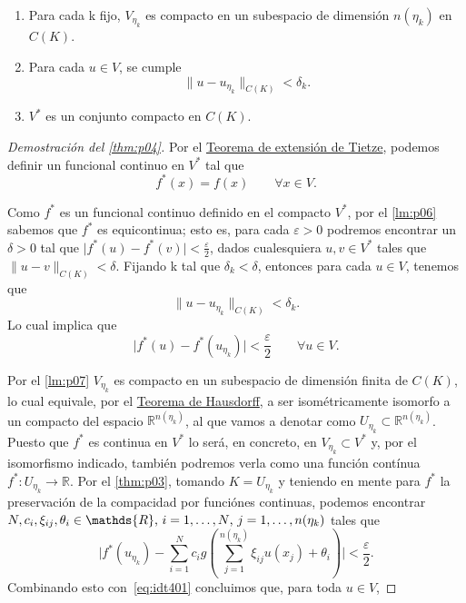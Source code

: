 \begin{lema}\label{lm:p07}
\leavevmode\newline
\begin{enumerate}
\item Para cada k fijo, $V_{\eta_{k}}$ es compacto en un subespacio de dimensión $n(\eta_{k})$ en $C(K)$.
\item Para cada \(u \in V\), se cumple 
\[ \parallel u - u_{\eta_{k}}\parallel_{C(K)} < \delta_{k}.\]
\item $V^{*}$ es un conjunto compacto en $C(K)$.
\end{enumerate}
\end{lema}
\begin{proof}[Demostración del \autoref{thm:p04}]
Por el \hyperref[thm:h07]{Teorema de extensión de Tietze}, podemos definir un funcional continuo en $V^{*}$ tal que \[ f^{*}(x) = f(x) \qquad  \forall x\in V.\]

Como $f^{*}$ es un funcional continuo definido en el compacto $V^{*}$, por el \autoref{lm:p06} sabemos que $f^{*}$ es equicontinua; esto es, para cada \( \varepsilon >0\) podremos encontrar un \(\delta > 0 \) tal que \( \vert f^{*}(u)-f^{*}(v)\vert < \frac{\varepsilon}{2} \), dados cualesquiera \(u,v\in V^{*}\) tales que \(\parallel u-v\parallel_{C(K)}<\delta\).
Fijando k tal que \(\delta_{k}<\delta\), entonces para cada \( u\in V\), tenemos que \[\parallel u - u_{\eta_{k}}\parallel_{C(K)} < \delta_{k}.\]
Lo cual implica que
\begin{equation}\label{eq:idt401}
\vert f^{*}(u)-f^{*}(u_{\eta_{k}})\vert < \frac{\varepsilon}{2} \qquad \forall u\in V.
\end{equation}

Por el \autoref{lm:p07} $V_{\eta_{k}}$ es compacto en un subespacio de dimensión finita de $C(K)$, lo cual equivale, por el \hyperref[thm:h01]{Teorema de Hausdorff}, a ser isométricamente isomorfo a un compacto del espacio $ \mathds{R}^{n(\eta_{k})}$, al que vamos a denotar como $U_{\eta_{k}}\subset \mathds{R}^{n(\eta_{k})}$. Puesto que $f^{*}$ es continua en $V^{*}$ lo será, en concreto, en $V_{\eta_{k}}\subset V^{*}$ y, por el isomorfismo indicado, también podremos verla como una función contínua $f^{*}:U_{\eta_{k}}\rightarrow \mathds{R}$. Por el \autoref{thm:p03}, tomando $K=U_{\eta_{k}}$ y teniendo en mente para $f^{*}$ la preservación de la compacidad por funciónes continuas, podemos encontrar 
\( N,c_{i} , \xi_{ij} , \theta_{i} \in \mathds{R}$, $i=1,\ldots,N$, $j=1,\ldots,n( \eta_{k} ) \) tales que
\[\vert f^{*}(u_{\eta_{k}})-\sum_{i=1}^{N} c_{i}g(\sum_{j=1}^{n(\eta_{k})} \xi_{ij} u(x_{j}) + \theta_{i}) \vert < \frac{\varepsilon}{2}.\]
Combinando esto con~\eqref{eq:idt401} concluimos que, para toda $u\in V$,


\end{proof}
